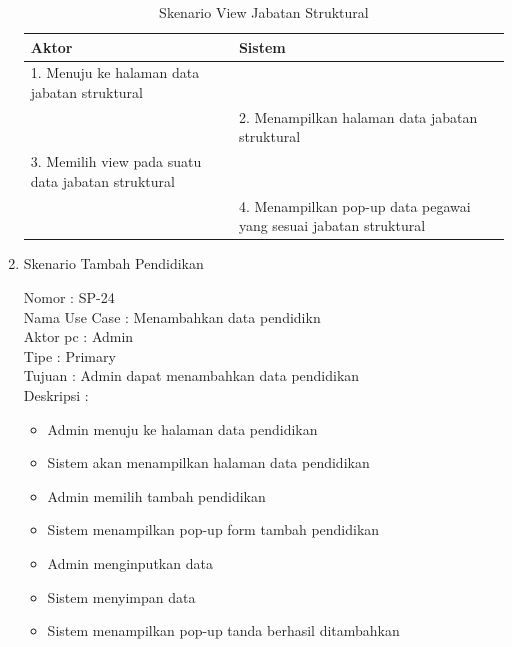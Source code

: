 \begin{enumerate}
\begin{itemize}
\end{itemize}

\begin{table}
	\caption{Skenario View Jabatan Struktural}
	\centering
	\begin{tabular}{ | p{75.5mm} | p{53mm}|}
		\hline 
		\textbf{Aktor} & \textbf{Sistem} \\
		\hline
		
		1.	Menuju ke halaman data jabatan struktural &  \\
		
		\hline
		
		&  2.	Menampilkan halaman data jabatan struktural\\
		
		\hline
		
		3. Memilih view pada suatu data jabatan struktural& \\
		
		\hline
		
		& 4.	Menampilkan pop-up data pegawai yang sesuai jabatan struktural \\
		\hline
		
	\end{tabular}
\end{table}

\item Skenario Tambah Pendidikan

Nomor \kern 3.6pc : SP-24 \\
Nama Use Case : Menambahkan data pendidikn \\
Aktor  pc : Admin \\
Tipe \kern 4.6pc : Primary \\
Tujuan \kern 3.6pc : Admin dapat menambahkan data pendidikan \\
Deskripsi \kern 2.5pc : 

\begin{itemize}
	\item Admin menuju ke halaman data pendidikan
	\item Sistem akan menampilkan halaman data pendidikan
	\item Admin memilih tambah pendidikan
	\item Sistem menampilkan pop-up form tambah pendidikan
	\item Admin menginputkan data
	\item Sistem menyimpan data
	\item Sistem menampilkan pop-up tanda berhasil ditambahkan
	
\end{itemize}


\end{enumerate}
